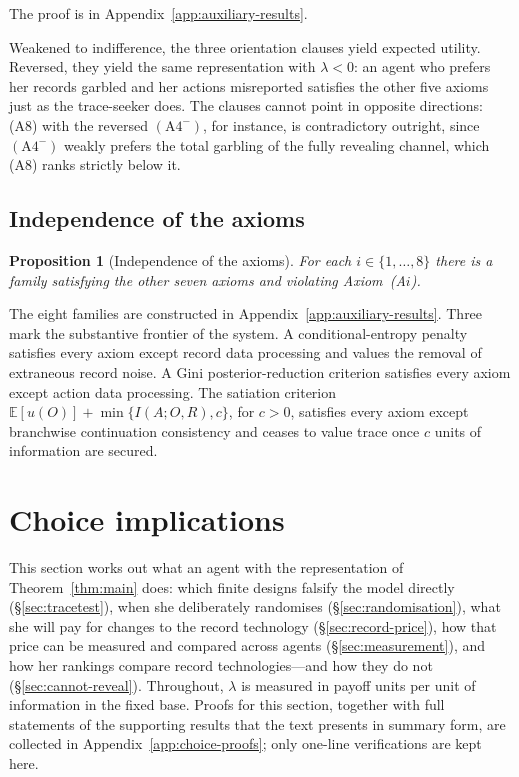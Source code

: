 \documentclass[11pt,a4paper]{article}
\newtheorem{proposition}[theorem]{Proposition}
\theoremstyle{definition}
\newcommand{\E}{\mathbb E}
\newcommand{\1}{\mathbf 1}
\begin{document}
The proof is in Appendix~\ref{app:auxiliary-results}.

Weakened to indifference, the three orientation clauses yield expected utility.  Reversed, they yield the same
representation with $\lambda<0$: an agent who prefers her records garbled and her actions misreported satisfies
the other five axioms just as the trace-seeker does.  The clauses cannot point in opposite directions:
\textup{(A8)} with the reversed $(\mathrm{A}4^-)$, for instance, is contradictory outright, since
$(\mathrm{A}4^-)$ weakly prefers the total garbling of the fully revealing channel, which \textup{(A8)} ranks
strictly below it.

\subsection{Independence of the axioms}

\begin{proposition}[Independence of the axioms]\label{prop:independence}
For each $i\in\{1,\ldots,8\}$ there is a family satisfying the other seven axioms and violating
Axiom~\textup{(A$i$)}.
\end{proposition}

The eight families are constructed in Appendix~\ref{app:auxiliary-results}.  Three mark the substantive frontier of the
system.  A conditional-entropy penalty satisfies every axiom except record data processing and values the removal of
extraneous record noise.  A Gini posterior-reduction criterion satisfies every axiom except action data processing.
The satiation criterion $\E[u(O)]+\min\{I(A;O,R),c\}$, for $c>0$, satisfies every axiom except branchwise
continuation consistency and ceases to value trace once $c$ units of information are secured.

\section{Choice implications}\label{sec:implications}

This section works out what an agent with the representation of Theorem~\ref{thm:main} does: which finite designs
falsify the model directly (\S\ref{sec:tracetest}), when she deliberately randomises (\S\ref{sec:randomisation}),
what she will pay for changes to the record technology (\S\ref{sec:record-price}), how that price can be
measured and compared across agents (\S\ref{sec:measurement}), and how her rankings compare record
technologies---and how they do not (\S\ref{sec:cannot-reveal}).
Throughout, $\lambda$ is measured in payoff units per unit of information in the fixed base.  Proofs for this
section, together with full statements of the supporting results that the text presents in summary form, are
collected in Appendix~\ref{app:choice-proofs}; only one-line verifications are kept here.
\end{document}
